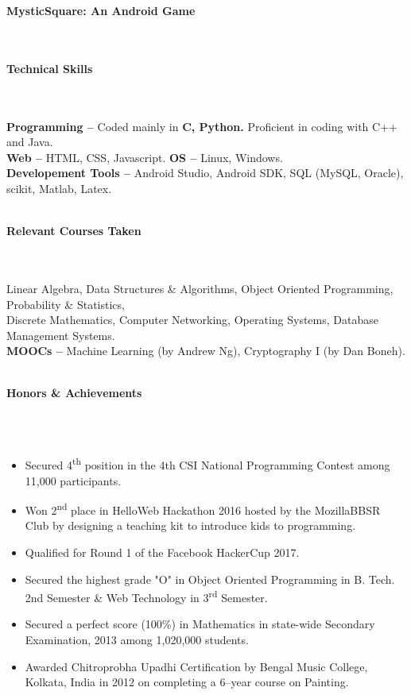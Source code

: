 \documentclass[a4paper,10pt]{article}
\newcommand{\lsep}{-0.5cm}
\newcommand{\resheading}[1]{{\large \colorbox{mygrey}{\begin{minipage}{0.99\textwidth}{\textbf{#1 \vphantom{p\^{E}}}}\end{minipage}}}}
\begin{document}
\indent\textbf{MysticSquare: An Android Game}\\
\\\\


\resheading{\textbf{Technical Skills} }\\\\[\lsep]

\indent\textbf{Programming -- }Coded mainly in \textbf{C, Python.} Proficient in coding with C++ and Java.\\
\indent\textbf{Web -- } HTML, CSS, Javascript. \indent\indent\textbf{OS -- } Linux, Windows.\\
\indent\textbf{Developement Tools --} Android Studio, Android SDK, SQL (MySQL, Oracle), scikit, Matlab, Latex.\\\\


\resheading{\textbf{Relevant Courses Taken} }\\\\[\lsep]

\indent Linear Algebra, Data Structures \& Algorithms, Object Oriented Programming, Probability \& Statistics,\\
\indent Discrete Mathematics, Computer Networking, Operating Systems, Database Management Systems.\\
\indent\textbf{MOOCs -- }Machine Learning (by Andrew Ng), Cryptography I (by Dan Boneh).\\
\\


\resheading{\textbf{Honors \& Achievements}}\\[\lsep]\\[-0.2cm]
\begin{itemize}
\item {Secured 4\textsuperscript{th} position in the 4th CSI National Programming Contest among 11,000 participants.}
\item {Won 2\textsuperscript{nd} place in HelloWeb Hackathon 2016 hosted by the MozillaBBSR Club by designing a teaching kit to introduce kids to programming.}
\item {Qualified for Round 1 of the Facebook HackerCup 2017.}
\item {Secured the highest grade "O" in Object Oriented Programming in B. Tech. 2nd Semester \& Web Technology in 3\textsuperscript{rd} Semester.}
\item {Secured a perfect score (100\%) in Mathematics in state-wide Secondary Examination, 2013 among 1,020,000 students.}
\item {Awarded Chitroprobha Upadhi Certification by Bengal Music College, Kolkata, India in 2012 on completing a 6--year course on Painting.}
\end{itemize}
\end{document}
